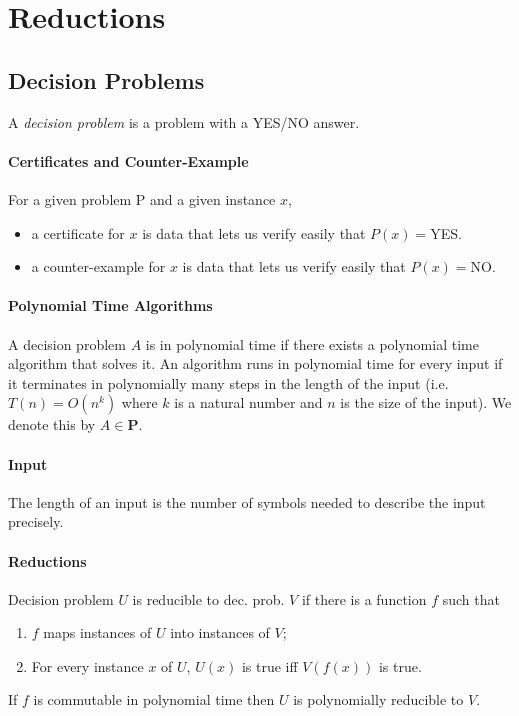 
\section{Reductions}

\subsection{Decision Problems}
A \textit{decision problem} is a problem with a YES/NO answer.

\paragraph{Certificates and Counter-Example}
For a given problem P and a given instance \(x\),
\begin{itemize}
    \item a certificate for \(x\) is data that lets us verify easily that \(P(x)=\)YES.
    \item a counter-example for \(x\) is data that lets us verify easily that \(P(x)=\)NO.
\end{itemize}

\paragraph{Polynomial Time Algorithms}
A decision problem \(A\) is in polynomial time if there exists a polynomial time algorithm that solves it. An algorithm runs in polynomial time for every input if it terminates in polynomially many steps in the length of the input (i.e. \(T(n) = O(n^k)\) where \(k\) is a natural number and \(n\) is the size of the input). We denote this by \(A\in \textbf{P}\).

\paragraph{Input}
The length of an input is the number of symbols needed to describe the input precisely.

\paragraph{Reductions}
Decision problem \(U\) is reducible to dec. prob. \(V\) if there is a function \(f\) such that
\begin{enumerate}
    \item \(f\) maps instances of \(U\) into instances of \(V\);
    \item For every instance \(x\) of \(U\), \(U(x)\) is true iff \(V(f(x))\) is true.
\end{enumerate}
If \(f\) is commutable in polynomial time then \(U\) is polynomially reducible to \(V\).

